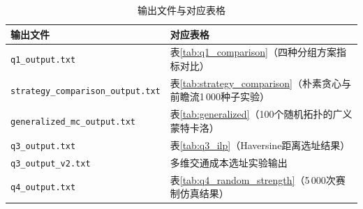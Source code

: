 \documentclass[12pt,a4paper]{article}
\begin{document}
\begin{table}[H]
  \centering
  \caption*{输出文件与对应表格}
  \small
  \setlength{\tabcolsep}{3pt}
  \begin{tabular}{p{6.5cm}p{8.5cm}}
    \toprule
    输出文件 & 对应表格 \\
    \midrule
    \texttt{q1\_output.txt} & 表\ref{tab:q1_comparison}（四种分组方案指标对比） \\
    \texttt{strategy\_comparison\_output.txt} & 表\ref{tab:strategy_comparison}（朴素贪心与前瞻流1\,000种子实验） \\
    \texttt{generalized\_mc\_output.txt} & 表\ref{tab:generalized}（100个随机拓扑的广义蒙特卡洛） \\
    \texttt{q3\_output.txt} & 表\ref{tab:q3_ilp}（Haversine距离选址结果） \\
    \texttt{q3\_output\_v2.txt} & 多维交通成本选址实验输出 \\
    \texttt{q4\_output.txt} & 表\ref{tab:q4_random_strength}（5\,000次赛制仿真结果） \\
    \bottomrule
  \end{tabular}
\end{table}
\end{document}
